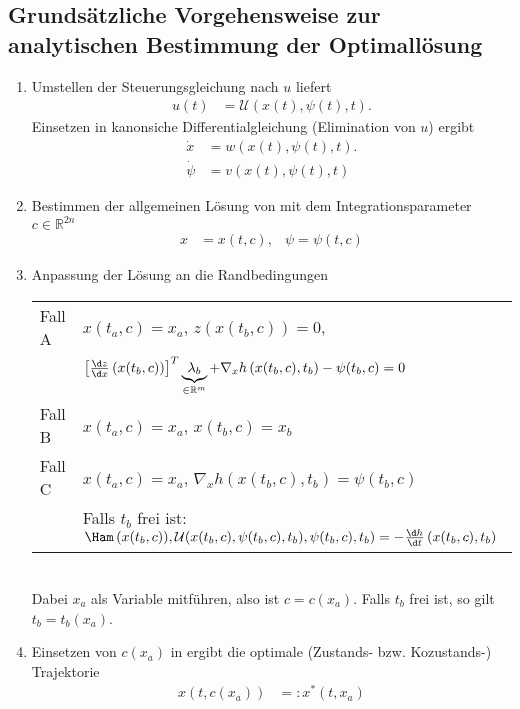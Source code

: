 \subsection{Grundsätzliche Vorgehensweise zur analytischen Bestimmung der Optimallösung}
\begin{enumerate}[label=(S\arabic*)]
  \item Umstellen der Steuerungsgleichung nach $u$ liefert 
  \begin{align}
  	u(t) & = \mathcal{U}\left(x(t),\psi(t),t \right). \label{eqn:kap_2_vor_optlsg_s1_u}
  \end{align}
  Einsetzen in kanonsiche Differentialgleichung (Elimination von $u$) ergibt
  \begin{align}
  	\dot{x} & = w(x(t),\psi(t),t). \label{eqn:kap_2_vor_optlsg_s1_x}\\
  	\dot{\psi} &= v(x(t),\psi(t),t)
  \end{align}
  \item Bestimmen der allgemeinen Lösung von  mit dem Integrationsparameter $c\in\mathbb{R}^{2n}$
  \begin{align}
  	x & = x(t,c), & \psi=\psi(t,c)	\label{eqn:kap_2_vor_optlsg_s2}
  \end{align}
  \item Anpassung der Lösung an die Randbedingungen\\
  \begin{tabular}{ll}
  Fall A	& $x(t_a,c)=x_a$, $z\left(x(t_b,c) \right)=0$,\\ 
  			& $\left[\frac{\d z}{\d x}\left(x(t_b,c) \right) \right]^T\underbrace{\lambda_b}_{\in\mathbb{R}^m}+\nabla_x h\left(x(t_b,c),t_b
  			\right)-\psi(t_b,c)=0$\\
  Fall B	& $x(t_a,c)=x_a$, $x(t_b,c)=x_b$\\
  Fall C	& $x(t_a,c)=x_a$, $\nabla_x h\left(x(t_b,c),t_b \right) = \psi(t_b,c)$\\
  			& Falls $t_b$ frei ist: $\Ham\left(x(t_b,c)),\mathcal{U}(x(t_b,c),\psi(t_b,c),t_b),\psi(t_b,c),t_b \right)=-\frac{\d h}{\d t}\left(x(t_b,c),t_b \right)$
  \end{tabular}\\
  Dabei $x_a$ als Variable mitführen, also ist $c=c(x_a)$. Falls $t_b$ frei ist, so gilt $t_b=t_b(x_a)$.
  \item Einsetzen von $c(x_a)$ in  ergibt die optimale (Zustands- bzw. Kozustands-) Trajektorie 
  \begin{align}
  	x\left(t,c(x_a) \right) & =: x^{\ast}(t,x_a)	\label{eqn:kap_2_vor_optlsg_s4}

\end{align}
\end{enumerate}
